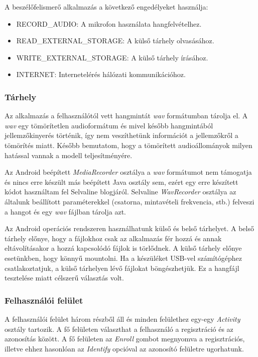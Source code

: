 A beszélőfelismerő alkalmazás a következő engedélyeket használja:

\begin{itemize}
	\item RECORD\_AUDIO: A mikrofon használata hangfelvételhez.
	\item READ\_EXTERNAL\_STORAGE: A külső tárhely olvasásához.
	\item WRITE\_EXTERNAL\_STORAGE: A külső tárhely írásához.
	\item INTERNET: Internetelérés hálózati kommunikációhoz.
\end{itemize}

\subsubsection{Tárhely}

Az alkalmazás a felhasználótól vett hangmintát \emph{wav} formátumban tárolja el. A \emph{wav} egy tömörítetlen audioformátum és mivel később hangmintából jellemzőkinyerés történik, így nem veszíthetünk információt a jellemzőkről a tömörítés miatt. Később bemutatom, hogy a tömörített audioállományok milyen hatással vannak a modell teljesítményére.

Az Android beépített \emph{MediaRecorder} osztálya a \emph{wav} formátumot nem támogatja és nincs erre készült más beépített Java osztály sem, ezért egy erre készített kódot használtam fel Selvaline blogjáról. Selvaline \emph{WavRecorder} osztálya az általunk beállított paraméterekkel (csatorna, mintavételi frekvencia, stb.) felveszi a hangot és egy \emph{wav} fájlban tárolja azt.

Az Android operációs rendszeren használhatunk külső és belső tárhelyet. A belső tárhely előnye, hogy a fájlokhoz csak az alkalmazás fér hozzá és annak eltávolításakor a hozzá kapcsolódó fájlok is törlődnek. A külső tárhely előnye esetünkben, hogy könnyű mountolni. Ha a készüléket USB-vel számítógéphez csatlakoztatjuk, a külső tárhelyen lévő fájlokat böngészhetjük. Ez a hangfájl tesztelése miatt célszerű választás volt. 



\subsubsection{Felhasználói felület}

 A felhasználói felület három részből áll és minden felülethez egy-egy \emph{Activity} osztály tartozik. A fő felületen választhat a felhasználó a regisztráció és az azonosítás között. A fő felületen az \emph{Enroll} gombot megnyomva a regisztrációs, illetve ehhez hasonlóan az \emph{Identify} opcióval az azonosító felületre ugorhatunk.


